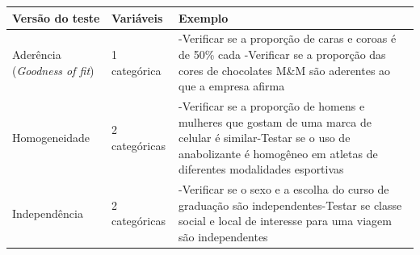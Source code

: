 \documentclass[
]{book}
\begin{document}
\begin{longtable}[]{@{}lll@{}}
\toprule
\begin{minipage}[b]{0.30\columnwidth}\raggedright
Versão do teste\strut
\end{minipage} & \begin{minipage}[b]{0.30\columnwidth}\raggedright
Variáveis\strut
\end{minipage} & \begin{minipage}[b]{0.30\columnwidth}\raggedright
Exemplo\strut
\end{minipage}\tabularnewline
\midrule
\endhead
\begin{minipage}[t]{0.30\columnwidth}\raggedright
Aderência (\emph{Goodness of fit})\strut
\end{minipage} & \begin{minipage}[t]{0.30\columnwidth}\raggedright
1 categórica\strut
\end{minipage} & \begin{minipage}[t]{0.30\columnwidth}\raggedright
-Verificar se a proporção de caras e coroas é de 50\% cada -Verificar se a proporção das cores de chocolates M\&M são aderentes ao que a empresa afirma\strut
\end{minipage}\tabularnewline
\begin{minipage}[t]{0.30\columnwidth}\raggedright
Homogeneidade\strut
\end{minipage} & \begin{minipage}[t]{0.30\columnwidth}\raggedright
2 categóricas\strut
\end{minipage} & \begin{minipage}[t]{0.30\columnwidth}\raggedright
-Verificar se a proporção de homens e mulheres que gostam de uma marca de celular é similar-Testar se o uso de anabolizante é homogêneo em atletas de diferentes modalidades esportivas\strut
\end{minipage}\tabularnewline
\begin{minipage}[t]{0.30\columnwidth}\raggedright
Independência\strut
\end{minipage} & \begin{minipage}[t]{0.30\columnwidth}\raggedright
2 categóricas\strut
\end{minipage} & \begin{minipage}[t]{0.30\columnwidth}\raggedright
-Verificar se o sexo e a escolha do curso de graduação são independentes-Testar se classe social e local de interesse para uma viagem são independentes\strut
\end{minipage}\tabularnewline
\bottomrule
\end{longtable}
\end{document}
